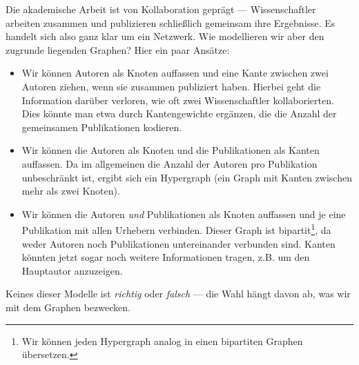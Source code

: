 \begin{example}
    Die akademische Arbeit ist von Kollaboration geprägt --- Wissenschaftler arbeiten zusammen und publizieren schließlich gemeinsam ihre Ergebnisse.
    Es handelt sich also ganz klar um ein Netzwerk.
    Wie modellieren wir aber den zugrunde liegenden Graphen?
    Hier ein paar Ansätze:

    \begin{itemize}
        \item
              Wir können Autoren als Knoten auffassen und eine Kante zwischen zwei Autoren ziehen, wenn sie zusammen publiziert haben.
              Hierbei geht die Information darüber verloren, wie oft zwei Wissenschaftler kollaborierten.
              Dies könnte man etwa durch Kantengewichte ergänzen, die die Anzahl der gemeinsamen Publikationen kodieren.

        \item Wir können die Autoren als Knoten und die Publikationen als Kanten auffassen.
              Da im allgemeinen die Anzahl der Autoren pro Publikation unbeschränkt ist, ergibt sich ein Hypergraph (ein Graph mit Kanten zwischen mehr als zwei Knoten).

        \item Wir können die Autoren \emph{und} Publikationen als Knoten auffassen und je eine Publikation mit allen Urhebern verbinden.
              Dieser Graph ist bipartit\footnote{Wir können jeden Hypergraph analog in einen bipartiten Graphen übersetzen.}, da weder Autoren noch Publikationen untereinander verbunden sind.
              Kanten könnten jetzt sogar noch weitere Informationen tragen, z.B. um den Hauptautor anzuzeigen.\hfill \qedhere
    \end{itemize}
\end{example}

\noindent
Keines dieser Modelle ist \emph{richtig} oder \emph{falsch} --- die Wahl hängt davon ab, was wir mit dem Graphen bezwecken.

